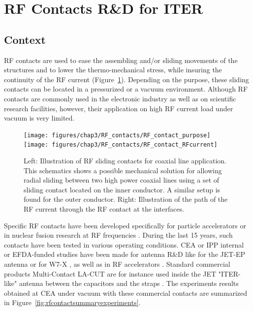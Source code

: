 {%

\section{RF Contacts R\&D for ITER}\label{sec:RF_contacts}
\subsection{Context}
RF contacts are used to ease the assembling and/or sliding movements of the structures and to lower the thermo-mechanical stress, while insuring the continuity of the RF current (Figure~\ref{fig:rfcontactpurpose}). Depending on the purpose, these sliding contacts can be located in a pressurized or a vacuum environment. Although RF contacts are commonly used in the electronic industry as well as on scientific research facilities, however, their application on high RF current load under vacuum is very limited. 

\begin{figure}[h]
	\centering
	\texttt{[image: figures/chap3/RF\_contacts/RF\_contact\_purpose]}
	\texttt{[image: figures/chap3/RF\_contacts/RF\_contact\_RFcurrent]}
	\caption{Left: Illustration of RF sliding contacts for coaxial line application. This schematics shows a possible mechanical solution for allowing radial sliding between two high power coaxial lines using a set of sliding contact located on the inner conductor. A similar setup is found for the outer conductor. Right: Illustration of the path of the RF current through the RF contact at the interfaces.}
	\label{fig:rfcontactpurpose}
\end{figure}

%


Specific RF contacts have been developed specifically for particle accelerators  or in nuclear fusion research at RF frequencies  . During the last 15 years, such contacts have been tested in various operating conditions. CEA or IPP internal or EFDA-funded studies have been made for antenna R\&D like for the JET-EP antenna or for W7-X , as well as in RF accelerators . Standard commercial products Multi-Contact LA-CUT are for instance used inside the JET "ITER-like" antenna between the capacitors and the straps . The experiments results obtained at CEA under vacuum with these commercial contacts are summarized in Figure~\ref{fig:rfcontactsummaryexperiments}.



}
